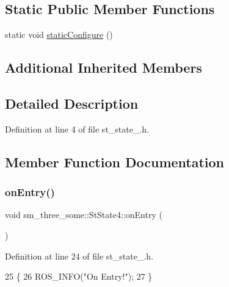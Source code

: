 \subsection*{Static Public Member Functions}
\begin{DoxyCompactItemize}
\item 
static void \hyperlink{structsm__three__some_1_1StState4_ae244f918fa096ecbb501e25b9ca07512}{static\+Configure} ()
\end{DoxyCompactItemize}
\subsection*{Additional Inherited Members}


\subsection{Detailed Description}


Definition at line 4 of file st\+\_\+state\+\_.\+h.



\subsection{Member Function Documentation}
\mbox{\label{structsm__three__some_1_1StState4_a2140ab3ca693422132501cab77efca63}} 
\subsubsection{\texorpdfstring{on\+Entry()}{onEntry()}}
{\footnotesize\ttfamily void sm\+\_\+three\+\_\+some\+::\+St\+State4\+::on\+Entry (\begin{DoxyParamCaption}{ }\end{DoxyParamCaption})\hspace{0.3cm}{\ttfamily [inline]}}



Definition at line 24 of file st\+\_\+state\+\_.\+h.


\begin{DoxyCode}
25     \{
26         ROS\_INFO(\textcolor{stringliteral}{"On Entry!"});
27     \}
\end{DoxyCode}
\mbox{\label{structsm__three__some_1_1StState4_a3479e642b294941bb91c09d211df84e7}} 
